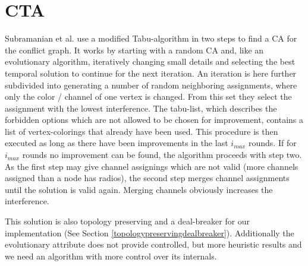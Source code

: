   \section{\ac{CTA}}
    Subramanian et al. \cite{CTA} use a modified Tabu-algorithm \cite{tabu} in two steps to find a \ac{CA} for the conflict graph.
    It works by starting with a random \ac{CA} and, like an evolutionary algorithm, 
    iteratively changing small details and selecting the best temporal solution to continue for the next iteration.
    An iteration is here further subdivided into generating a number of random neighboring assignments,
    where only the color / channel of one vertex is changed.
    From this set they select the assignment with the lowest interference.
    The tabu-list, which describes the forbidden options which are not allowed to be chosen for improvement,
    contains a list of vertex-colorings that already have been used.
    This procedure is then executed as long as there have been improvements in the last \textit{$i_{max}$} rounds.
    If for \textit{$i_{max}$} rounds no improvement can be found, the algorithm proceeds with step two.
    As the first step may give channel assignings which are not valid (more channels assigned than a node has radios), 
    the second step merges channel assignments until the solution is valid again.
    Merging channels obviously increases the interference.
    
    This solution is also topology preserving and a deal-breaker for our implementation (See Section \ref{topologypreservingdealbreaker}).
    Additionally the evolutionary attribute does not provide controlled, but more heuristic results and we need an algorithm with more control over its internals.